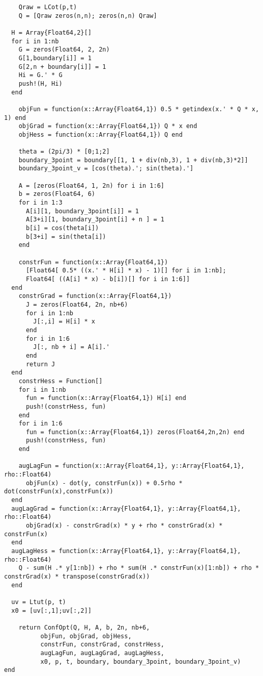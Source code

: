 \documentclass{article} %
\begin{document}
\begin{lstlisting}
    Qraw = LCot(p,t)
    Q = [Qraw zeros(n,n); zeros(n,n) Qraw]

  H = Array{Float64,2}[]
  for i in 1:nb
    G = zeros(Float64, 2, 2n)
    G[1,boundary[i]] = 1
    G[2,n + boundary[i]] = 1
    Hi = G.' * G
    push!(H, Hi)
  end

    objFun = function(x::Array{Float64,1}) 0.5 * getindex(x.' * Q * x, 1) end
    objGrad = function(x::Array{Float64,1}) Q * x end
    objHess = function(x::Array{Float64,1}) Q end

    theta = (2pi/3) * [0;1;2]
    boundary_3point = boundary[[1, 1 + div(nb,3), 1 + div(nb,3)*2]]
    boundary_3point_v = [cos(theta).'; sin(theta).']

    A = [zeros(Float64, 1, 2n) for i in 1:6]
    b = zeros(Float64, 6)
    for i in 1:3
      A[i][1, boundary_3point[i]] = 1
      A[3+i][1, boundary_3point[i] + n ] = 1
      b[i] = cos(theta[i])
      b[3+i] = sin(theta[i])
    end

    constrFun = function(x::Array{Float64,1}) 
      [Float64[ 0.5* ((x.' * H[i] * x) - 1)[] for i in 1:nb];
      Float64[ ((A[i] * x) - b[i])[] for i in 1:6]]
  end
    constrGrad = function(x::Array{Float64,1})
      J = zeros(Float64, 2n, nb+6)
      for i in 1:nb
        J[:,i] = H[i] * x
      end
      for i in 1:6
        J[:, nb + i] = A[i].'
      end
      return J
  end
    constrHess = Function[]
    for i in 1:nb
      fun = function(x::Array{Float64,1}) H[i] end
      push!(constrHess, fun)
    end
    for i in 1:6
      fun = function(x::Array{Float64,1}) zeros(Float64,2n,2n) end
      push!(constrHess, fun)
    end

    augLagFun = function(x::Array{Float64,1}, y::Array{Float64,1}, rho::Float64)
      objFun(x) - dot(y, constrFun(x)) + 0.5rho * dot(constrFun(x),constrFun(x))
  end
  augLagGrad = function(x::Array{Float64,1}, y::Array{Float64,1}, rho::Float64)
      objGrad(x) - constrGrad(x) * y + rho * constrGrad(x) * constrFun(x)
  end
  augLagHess = function(x::Array{Float64,1}, y::Array{Float64,1}, rho::Float64)
    Q - sum(H .* y[1:nb]) + rho * sum(H .* constrFun(x)[1:nb]) + rho * constrGrad(x) * transpose(constrGrad(x))
  end

  uv = Ltut(p, t)
  x0 = [uv[:,1];uv[:,2]]

    return ConfOpt(Q, H, A, b, 2n, nb+6,
          objFun, objGrad, objHess,
          constrFun, constrGrad, constrHess,
          augLagFun, augLagGrad, augLagHess,
          x0, p, t, boundary, boundary_3point, boundary_3point_v)
end


\end{lstlisting}
\end{document}
